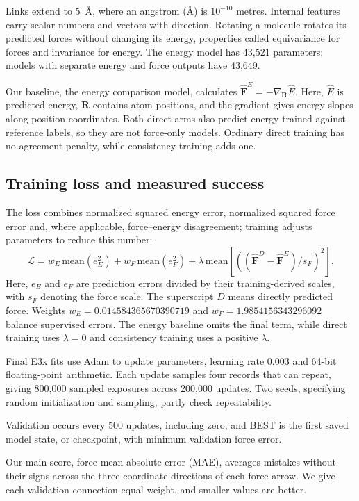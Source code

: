 \documentclass{article}
\begin{document}
Links extend to 5~\AA, where an angstrom (\AA) is $10^{-10}$ metres. Internal features carry scalar numbers and vectors with direction. Rotating a molecule rotates its predicted forces without changing its energy, properties called equivariance for forces and invariance for energy. The energy model has 43,521 parameters; models with separate energy and force outputs have 43,649.

Our baseline, the energy comparison model, calculates $\widehat{\mathbf F}^{E}=-\nabla_{\mathbf R}\widehat E$. Here, $\widehat E$ is predicted energy, $\mathbf R$ contains atom positions, and the gradient gives energy slopes along position coordinates. Both direct arms also predict energy trained against reference labels, so they are not force-only models. Ordinary direct training has no agreement penalty, while consistency training adds one.
\subsection{Training loss and measured success}
The loss combines normalized squared energy error, normalized squared force error and, where applicable, force--energy disagreement; training adjusts parameters to reduce this number:
\begin{equation}
\mathcal L=w_E\,\mathrm{mean}(e_E^2)+w_F\,\mathrm{mean}(e_F^2)
+\lambda\,\mathrm{mean}\!\left[\left((\widehat{\mathbf F}^{D}-\widehat{\mathbf F}^{E})/s_F\right)^2\right].
\end{equation}
Here, $e_E$ and $e_F$ are prediction errors divided by their training-derived scales, with $s_F$ denoting the force scale. The superscript $D$ means directly predicted force. Weights $w_E=0.014584365670390719$ and $w_F=1.9854156343296092$ balance supervised errors. The energy baseline omits the final term, while direct training uses $\lambda=0$ and consistency training uses a positive $\lambda$.

Final E3x fits use Adam to update parameters, learning rate 0.003 and 64-bit floating-point arithmetic. Each update samples four records that can repeat, giving 800,000 sampled exposures across 200,000 updates. Two seeds, specifying random initialization and sampling, partly check repeatability.

Validation occurs every 500 updates, including zero, and BEST is the first saved model state, or checkpoint, with minimum validation force error.

Our main score, force mean absolute error (MAE), averages mistakes without their signs across the three coordinate directions of each force arrow. We give each validation connection equal weight, and smaller values are better.
\end{document}
